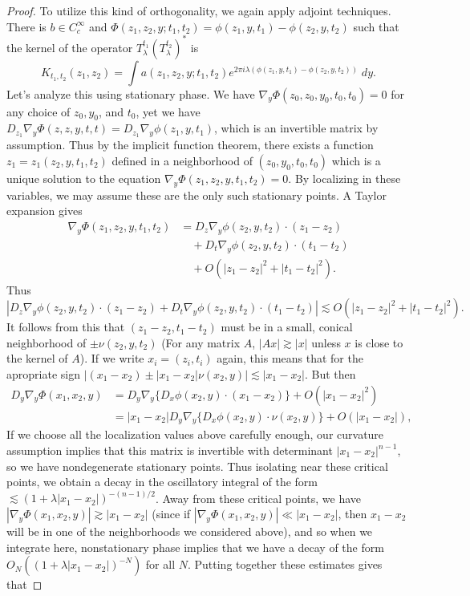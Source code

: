 \begin{proof}
    To utilize this kind of orthogonality, we again apply adjoint techniques. There is $b \in C_c^\infty$ and $\Phi(z_1,z_2,y;t_1,t_2) = \phi(z_1,y,t_1) - \phi(z_2,y,t_2)$ such that the kernel of the operator $T_\lambda^{t_1} (T_\lambda^{t_2})^*$ is
    \[ K_{t_1,t_2}(z_1,z_2) = \int a(z_1,z_2,y;t_1,t_2) e^{2 \pi i \lambda (\phi(z_1,y,t_1) - \phi(z_2,y,t_2))}\; dy. \]
    Let's analyze this using stationary phase. We have $\nabla_y \Phi(z_0,z_0,y_0,t_0,t_0) = 0$ for any choice of $z_0,y_0$, and $t_0$, yet we have $D_{z_1} \nabla_y \Phi(z,z,y,t,t) = D_{z_1} \nabla_y \phi(z_1,y,t_1)$, which is an invertible matrix by assumption. Thus by the implicit function theorem, there exists a function $z_1 = z_1(z_2,y,t_1,t_2)$ defined in a neighborhood of $(z_0,y_0,t_0,t_0)$ which is a unique solution to the equation $\nabla_y \Phi(z_1, z_2, y, t_1, t_2) = 0$. By localizing in these variables, we may assume these are the only such stationary points. A Taylor expansion gives
    \begin{align*}
        \nabla_y \Phi(z_1,z_2,y,t_1,t_2) &= D_z \nabla_y \phi(z_2,y,t_2) \cdot (z_1 - z_2)\\
        &\quad + D_t \nabla_y \phi(z_2,y,t_2) \cdot (t_1 - t_2)\\
        &\quad + O(|z_1 - z_2|^2 + |t_1 - t_2|^2).
    \end{align*}
    Thus
    \[ |D_z \nabla_y \phi(z_2,y,t_2) \cdot (z_1 - z_2) + D_t \nabla_y \phi(z_2,y,t_2) \cdot (t_1 - t_2)| \lesssim O(|z_1 - z_2|^2 + |t_1 - t_2|^2). \]
    It follows from this that $(z_1 - z_2, t_1 - t_2)$ must be in a small, conical neighborhood of $\pm \nu(z_2,y,t_2)$ (For any matrix $A$, $|Ax| \gtrsim |x|$ unless $x$ is close to the kernel of $A$). If we write $x_i = (z_i,t_i)$ again, this means that for the apropriate sign $|(x_1 - x_2) \pm |x_1 - x_2| \nu(x_2,y)| \lesssim |x_1 - x_2|$. But then
    \begin{align*}
        D_y \nabla_y \Phi(x_1,x_2,y) &= D_y \nabla_y \{ D_x \phi(x_2,y) \cdot (x_1 - x_2) \} + O(|x_1 - x_2|^2)\\
        &= |x_1 - x_2| D_y \nabla_y \{ D_x \phi(x_2,y) \cdot \nu(x_2,y) \} + O(|x_1 - x_2|),
    \end{align*}
    If we choose all the localization values above carefully enough, our curvature assumption implies that this matrix is invertible with determinant $|x_1 - x_2|^{n-1}$, so we have nondegenerate stationary points. Thus isolating near these critical points, we obtain a decay in the oscillatory integral of the form $\lesssim (1 + \lambda |x_1 - x_2|)^{-(n-1)/2}$. Away from these critical points, we have $|\nabla_y \Phi(x_1,x_2,y)| \gtrsim |x_1 - x_2|$ (since if $|\nabla_y \Phi(x_1,x_2,y)| \ll |x_1 - x_2|$, then $x_1 - x_2$ will be in one of the neighborhoods we considered above), and so when we integrate here, nonstationary phase implies that we have a decay of the form $O_N ( (1 + \lambda |x_1 - x_2|)^{-N} )$ for all $N$. Putting together these estimates gives that

\end{proof}
